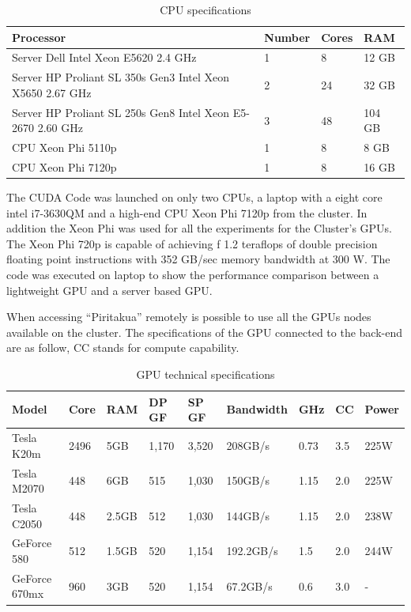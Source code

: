 \begin{table}[h]
\centering
\begin{tabular}{ | p{7.1cm}  | l | l | l |}
  \hline
  Processor & Number & Cores & RAM  \\
  \hline
  Server Dell Intel Xeon E5620 2.4 GHz & 1 & 8 & 12 GB \\
  \hline
  Server HP Proliant SL 350s Gen3 Intel Xeon X5650 2.67 GHz & 2 & 24 & 32 GB \\
  \hline
   Server HP Proliant SL 250s Gen8 Intel Xeon E5-2670 2.60 GHz & 3 & 48 &104 GB \\
   \hline
   CPU Xeon Phi  5110p & 1 & 8 & 8 GB\\
   \hline
   CPU Xeon Phi 7120p  & 1 & 8 & 16 GB\\
   \hline
  \end{tabular}
      \caption{CPU specifications}
  \label{tab:cpus}
  \end{table}
  
 The CUDA Code was launched on only two CPUs, a laptop with a eight core intel i7-3630QM and a high-end CPU Xeon Phi 7120p from the cluster. In addition the Xeon Phi was used for all the experiments for the Cluster's GPUs. The Xeon Phi 720p is capable of achieving f 1.2 teraflops of double precision floating point instructions with 352 GB/sec memory bandwidth at 300 W. The code was executed on laptop to show the performance comparison between a lightweight GPU and a server based GPU.

When accessing ``Piritakua'' remotely is possible to use all the GPUs nodes available on the cluster. The specifications of the GPU connected to the back-end are as follow, CC stands for compute capability.

\begin{table}[h]
\centering
  \begin{tabular}{ |  l  |  l  |  l  |  l  |  l  | l | l | l |l | }
    \hline
    Model & Core& RAM& DP GF& SP GF& Bandwidth& GHz& CC & Power\\
    \hline
    Tesla K20m & 2496 & 5GB & 1,170 & 3,520 & 208GB/s & 0.73 & 3.5 & 225W \\
   \hline
    Tesla M2070 & 448 & 6GB & 515 & 1,030 & 150GB/s & 1.15 &  2.0 & 225W\\
   \hline
     Tesla C2050 & 448 & 2.5GB & 512 & 1,030 & 144GB/s & 1.15  & 2.0 & 238W \\
   \hline
      GeForce 580 & 512 & 1.5GB & 520 & 1,154 & 192.2GB/s & 1.5 & 2.0 & 244W \\
   \hline
   GeForce 670mx & 960 & 3GB & 520 & 1,154 & 67.2GB/s & 0.6 & 3.0 &  - \\
   \hline
  \end{tabular}
    \caption{GPU technical specifications}
  \label{tab:gpus}
  \end{table}
  
